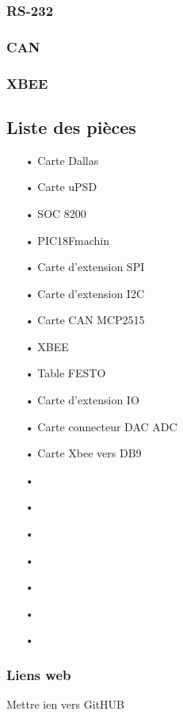 \documentclass[10pt,a4paper,final]{article}
\begin{document}
\begin{spacing}{1.5}
\subsubsection{RS-232}

\subsubsection{CAN}

\subsubsection{XBEE}




\subsection{Liste des pièces}
\begin{center}
\HRule
\end{center}
\begin{multicols}{3}
\begin{itemize}
\item[•]Carte Dallas
\item[•]Carte uPSD
\item[•]SOC 8200
\item[•]PIC18Fmachin
\item[•]Carte d'extension SPI
\item[•]Carte d'extension I2C
\item[•]Carte CAN MCP2515
\item[•]XBEE
\item[•]Table FESTO
\item[•]Carte d'extension IO
\item[•]Carte connecteur DAC ADC
\item[•]Carte Xbee vers DB9
\item[•]
\item[•]
\item[•]
\item[•]
\item[•]
\item[•]
\item[•]
\end{itemize}
\end{multicols}
\begin{center}
\HRule
\end{center}

\subsubsection{Liens web}
Mettre ien vers GitHUB


\end{spacing}
\end{document}
